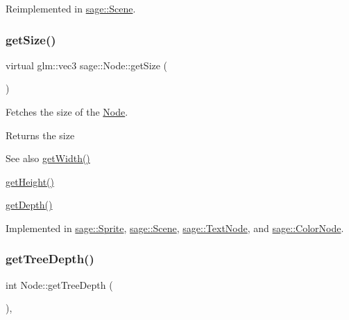 Reimplemented in \mbox{\hyperlink{classsage_1_1Scene_a2fec0ba5c1b495c89dea471f5a175f2e}{sage\+::\+Scene}}.

\mbox{\label{classsage_1_1Node_ad14a04d08b5261c27d3080f6a5e12836}} 
\subsubsection{\texorpdfstring{getSize()}{getSize()}}
{\footnotesize\ttfamily virtual glm\+::vec3 sage\+::\+Node\+::get\+Size (\begin{DoxyParamCaption}{ }\end{DoxyParamCaption})\hspace{0.3cm}{\ttfamily [pure virtual]}}



Fetches the size of the \mbox{\hyperlink{classsage_1_1Node}{Node}}. 

\begin{DoxyReturn}{Returns}
the size 
\end{DoxyReturn}
\begin{DoxySeeAlso}{See also}
\mbox{\hyperlink{classsage_1_1Node_a65163ffabcfe9f482282ea37ead6fc5f}{get\+Width()}} 

\mbox{\hyperlink{classsage_1_1Node_a6af5a8378ac8d2c3490adbc2a03f1247}{get\+Height()}} 

\mbox{\hyperlink{classsage_1_1Node_a5c4c28939c7adf7e4a65dbb02c0cbcd3}{get\+Depth()}} 
\end{DoxySeeAlso}


Implemented in \mbox{\hyperlink{classsage_1_1Sprite_a4fbebafc74986ae399360118796dd069}{sage\+::\+Sprite}}, \mbox{\hyperlink{classsage_1_1Scene_aebf891e256b5ca03ffef8903eb1c63e4}{sage\+::\+Scene}}, \mbox{\hyperlink{classsage_1_1TextNode_acdfcc350ceb004d934ab731ad9d1e176}{sage\+::\+Text\+Node}}, and \mbox{\hyperlink{classsage_1_1ColorNode_ad2ffce290e2cde1697ae609fe0a7b68c}{sage\+::\+Color\+Node}}.

\mbox{\label{classsage_1_1Node_a91e68b6452280bd6d273ff62105a5fe8}} 
\subsubsection{\texorpdfstring{getTreeDepth()}{getTreeDepth()}}
{\footnotesize\ttfamily int Node\+::get\+Tree\+Depth (\begin{DoxyParamCaption}{ }\end{DoxyParamCaption})\hspace{0.3cm}{\ttfamily [protected]}, {\ttfamily [virtual]}}



